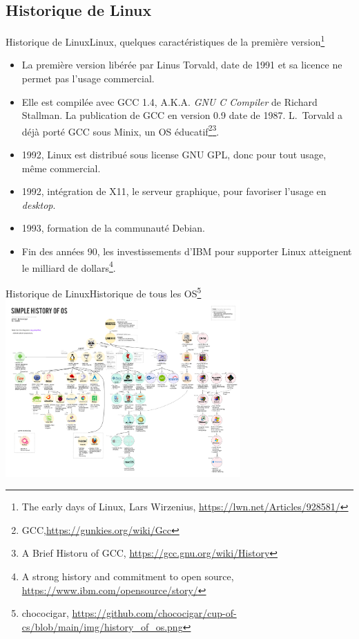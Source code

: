 \documentclass{beamer}
\begin{document}
    \subsection{Historique de Linux}\label{subsec:historique}

    \begin{frame}{Historique de Linux}{Linux, quelques caractéristiques de la première version\footnote{The early days of Linux, Lars Wirzenius, \url{https://lwn.net/Articles/928581/}}}
        \begin{footnotesize}
            \begin{itemize}
                \item La première version libérée par Linus Torvald, date de 1991 et sa licence ne permet pas l'usage commercial.
                \item Elle est compilée avec GCC 1.4, A.K.A. \textit{GNU C Compiler} de Richard Stallman.
                La publication de GCC en version 0.9 date de 1987.
                L.~Torvald a déjà porté GCC sous Minix, un OS éducatif\footnote{GCC,\url{https://gunkies.org/wiki/Gcc}}\footnotestep\footnote{A Brief Historu of GCC, \url{https://gcc.gnu.org/wiki/History}}.
                \item 1992, Linux est distribué sous license GNU GPL, donc pour tout usage, même commercial.
                \item 1992, intégration de X11, le serveur graphique, pour favoriser l'usage en \textit{desktop}.
                \item 1993, formation de la communauté Debian.
                \item Fin des années 90, les investissements d'IBM pour supporter Linux atteignent le milliard de dollars\footnote{A strong history and commitment to open source, \url{https://www.ibm.com/opensource/story/}}.
            \end{itemize}
        \end{footnotesize}
    \end{frame}

    \begin{frame}{Historique de Linux}{Historique de tous les OS\footnote{chococigar, \url{https://github.com/chococigar/cup-of-cs/blob/main/img/history\_of\_os.png}}}
        \centering
        \includegraphics[width=9cm]{image/history_of_os}
    \end{frame}
\end{document}
